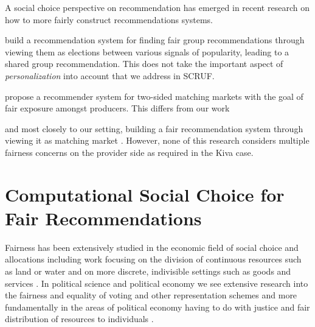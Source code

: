 
A social choice perspective on recommendation has emerged in recent research on how to more fairly construct recommendations systems.  


\citet{chakraborty2019equality} build a recommendation system for finding fair group recommendations through viewing them as elections between various signals of popularity, leading to a shared group recommendation.  This does not take the important aspect of \emph{personalization} into account that we address in SCRUF.

\citet{patro2020fairrec} propose a recommender system for two-sided matching markets with the goal of fair exposure amongst producers.  This differs from our work 

and most closely to our setting, building a fair recommendation system through viewing it as matching market \cite{patro2020fairrec}. However, none of this research considers multiple fairness concerns on the provider side as required in the Kiva case.


\section{Computational Social Choice for Fair Recommendations}

Fairness has been extensively studied in the economic field of social choice and allocations including work focusing on the division of continuous resources such as land or water \cite{Moulin:FairDivision} and on more discrete, indivisible settings such as goods and services \cite{Thomson:FairRules,Thomson:IntroFairAllocation}. In political science and political economy we see extensive research into the fairness and equality of voting and other representation schemes \cite{Brams:MathandDemocracy,Zwicker:Voting} and more fundamentally in the areas of political economy having to do with justice and fair distribution of resources to individuals \cite{Young:Equity,Rawls:Justice,Rescher:Justice}.

